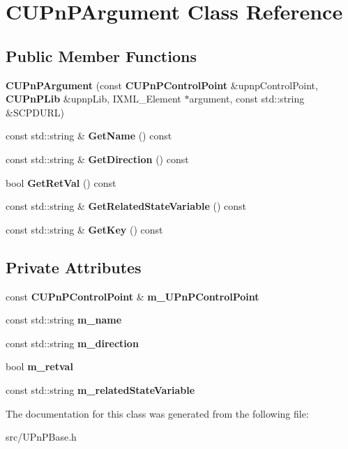 \section{CUPnPArgument Class Reference}
\label{classCUPnPArgument}
\subsection*{Public Member Functions}
\begin{DoxyCompactItemize}
\item 
{\bfseries CUPnPArgument} (const {\bf CUPnPControlPoint} \&upnpControlPoint, {\bf CUPnPLib} \&upnpLib, IXML\_\-Element $\ast$argument, const std::string \&SCPDURL)\label{classCUPnPArgument_ab7ab40b4e090ca84f2f40acd474d3035}

\item 
const std::string \& {\bfseries GetName} () const \label{classCUPnPArgument_aca0d4ad6775ade5d6e76e359f828b490}

\item 
const std::string \& {\bfseries GetDirection} () const \label{classCUPnPArgument_a1c703d314abf3591f809f1461395fc5e}

\item 
bool {\bfseries GetRetVal} () const \label{classCUPnPArgument_ada34e777a114a54bcaed01c46fda1b42}

\item 
const std::string \& {\bfseries GetRelatedStateVariable} () const \label{classCUPnPArgument_ad88f7b45c1471477f276b53e9b428d4e}

\item 
const std::string \& {\bfseries GetKey} () const \label{classCUPnPArgument_a25371a71e64d85f12aff78e03bc5e2f2}

\end{DoxyCompactItemize}
\subsection*{Private Attributes}
\begin{DoxyCompactItemize}
\item 
const {\bf CUPnPControlPoint} \& {\bfseries m\_\-UPnPControlPoint}\label{classCUPnPArgument_ac8f735b6c785f9bd5844305f336a42ff}

\item 
const std::string {\bfseries m\_\-name}\label{classCUPnPArgument_aaabc7a2a5975cb3f5616fa20562ffb6b}

\item 
const std::string {\bfseries m\_\-direction}\label{classCUPnPArgument_a807e531ca916eb7cbe0c453225f6c2e2}

\item 
bool {\bfseries m\_\-retval}\label{classCUPnPArgument_a0983432ff53d704e2a80a1db6e54823c}

\item 
const std::string {\bfseries m\_\-relatedStateVariable}\label{classCUPnPArgument_aaf269beac25e95efa30902e0895528d8}

\end{DoxyCompactItemize}


The documentation for this class was generated from the following file:\begin{DoxyCompactItemize}
\item 
src/UPnPBase.h\end{DoxyCompactItemize}
